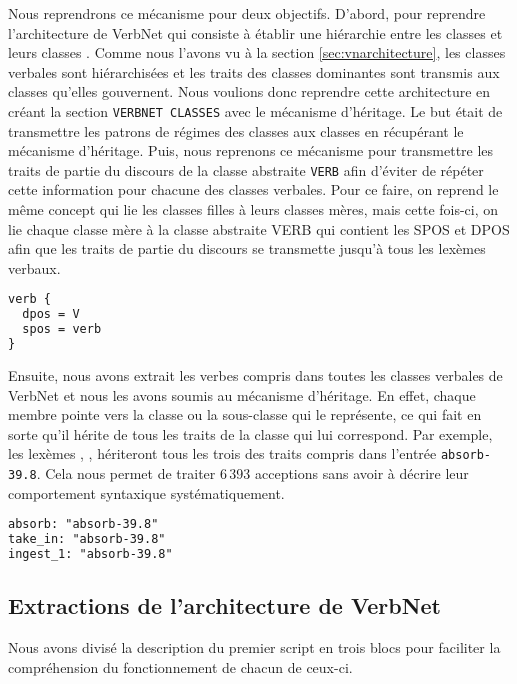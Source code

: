 Nous reprendrons ce mécanisme pour deux objectifs. D'abord, pour reprendre l'architecture de VerbNet qui consiste à établir une hiérarchie entre les classes  et leurs classes . Comme nous l'avons vu à la section \ref{sec:vnarchitecture}, les classes verbales sont hiérarchisées et les traits des classes dominantes sont transmis aux classes qu'elles gouvernent. Nous voulions donc reprendre cette architecture en créant la section \texttt{VERBNET CLASSES} avec le mécanisme d'héritage. Le but était de transmettre les patrons de régimes des classes  aux classes  en récupérant le mécanisme d'héritage. Puis, nous reprenons ce mécanisme pour transmettre les traits de partie du discours de la classe abstraite \texttt{VERB} afin d'éviter de répéter cette information pour chacune des classes verbales. Pour ce faire, on reprend le même concept qui lie les classes filles à leurs classes mères, mais cette fois-ci, on lie chaque classe mère à la classe abstraite VERB qui contient les \ac{SPOS} et \ac{DPOS} afin que les traits de partie du discours se transmette jusqu'à tous les lexèmes verbaux.

\begin{lstlisting}[language=XML, caption=Traits de la classe abstraite \texttt{VERB}]
verb {
  dpos = V
  spos = verb
}
\end{lstlisting}

Ensuite, nous avons extrait les verbes compris dans toutes les classes verbales de VerbNet et nous les avons soumis au mécanisme d'héritage. En effet, chaque membre pointe vers la classe ou la sous-classe qui le représente, ce qui fait en sorte qu'il hérite de tous les traits de la classe qui lui correspond. Par exemple, les lexèmes , ,  hériteront tous les trois des traits compris dans l'entrée \texttt{absorb-39.8}. Cela nous permet de traiter 6\,393 acceptions sans avoir à décrire leur comportement syntaxique systématiquement.

\begin{lstlisting}[language=XML]
absorb: "absorb-39.8"
take_in: "absorb-39.8"
ingest_1: "absorb-39.8"
\end{lstlisting}

\subsection{Extractions de l'architecture de VerbNet}

Nous avons divisé la description du premier script en trois blocs pour faciliter la compréhension du fonctionnement de chacun de ceux-ci.

